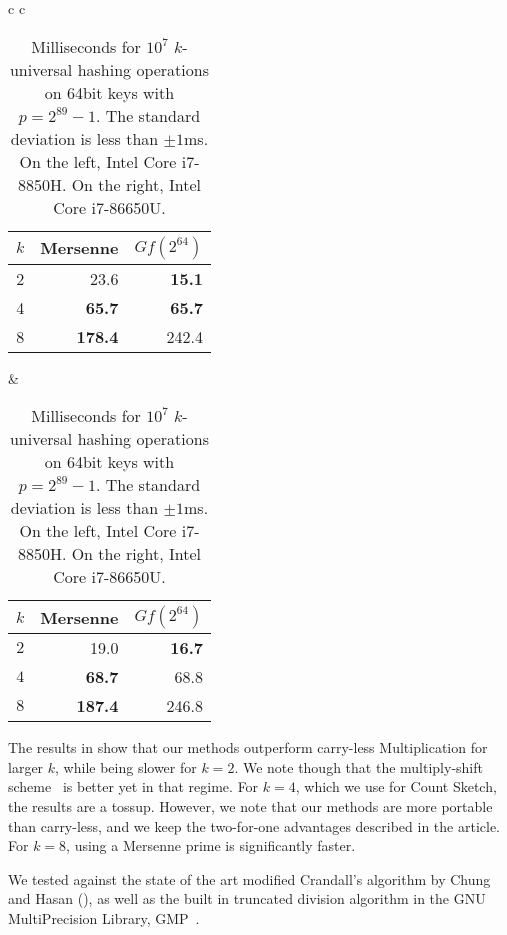 \begin{table}[H]
   \centering
   \begin{tabular}{c c}
      \begin{tabular}{r | r r}
         $k$ & Mersenne       & $Gf(2^{64})$ \\
         \hline
         2 & 23.6 & \textbf{15.1} \\
         4 & \textbf{65.7} & \textbf{65.7} \\
         8 & \textbf{178.4} & 242.4 \\
      \end{tabular}
      \hspace{.5em}
      &
      \hspace{.5em}
      \begin{tabular}{r | r r}
         $k$ & Mersenne       & $Gf(2^{64})$ \\
         \hline
         $2$ & 19.0           & \textbf{16.7} \\
         $4$ & \textbf{68.7}  & 68.8 \\
         $8$ & \textbf{187.4} & 246.8
      \end{tabular}
   \end{tabular}
   \caption{Milliseconds for $10^7$ $k$-universal hashing operations on 64bit keys with $p=2^{89}-1$.
      The standard deviation is less than $\pm1$ms.
         On the left, Intel Core i7-8850H.
         On the right, Intel Core i7-86650U.
   }
   \label{tab:hashing-experiments}
\end{table}

The results in  show that our methods outperform carry-less Multiplication for larger $k$, while being slower for $k=2$.
We note though that the multiply-shift scheme~\cite{dietzfel96universal} is better yet in that regime.
For $k=4$, which we use for Count Sketch, the results are a tossup.
However, we note that our methods are more portable than carry-less, and we keep the two-for-one advantages described in the article.
For $k = 8$, using a Mersenne prime is significantly faster.
\vspace{.5em} %

We tested  against the state of the art modified Crandall's algorithm by Chung and Hasan (), as well as the built in truncated division algorithm in the GNU MultiPrecision Library, GMP~\cite{granlund2010gnu}.

